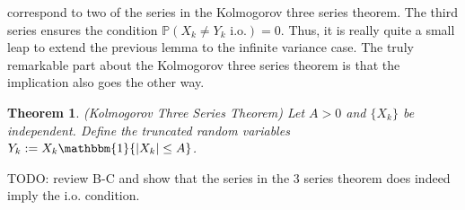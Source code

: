 \documentclass[12pt]{article}
\newcommand*{\abs}[1]{\left\lvert#1\right\rvert}
\newcommand{\Prob}{\mathbb{P}}
\newtheorem{thm}{Theorem}
\begin{document}
correspond to two of the series in the Kolmogorov three series theorem. The third series ensures the condition $\Prob(X_k \neq Y_k \text{ i.o.}) = 0$. Thus, it is really quite a small leap to extend the previous lemma to 
the infinite variance case. The truly remarkable part about the Kolmogorov three series theorem is that the implication also goes the other way. 
\begin{thm}
(Kolmogorov Three Series Theorem) Let $A > 0$ and $\{X_k\}$ be independent. Define the truncated random variables $Y_k := X_k \mathbbm{1}\{\abs{X_k} \leq A\}$. 
\end{thm}
TODO: review B-C and show that the series in the 3 series theorem does indeed imply the i.o. condition. 
\end{document}
